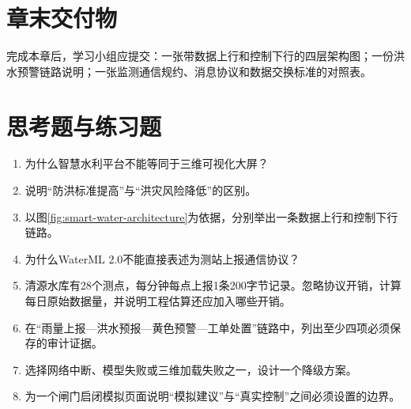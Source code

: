 \section*{章末交付物}

完成本章后，学习小组应提交：一张带数据上行和控制下行的四层架构图；一份洪水预警链路说明；一张监测通信规约、消息协议和数据交换标准的对照表。

\section*{思考题与练习题}

\begin{enumerate}
\item 为什么智慧水利平台不能等同于三维可视化大屏？
\item 说明“防洪标准提高”与“洪灾风险降低”的区别。
\item 以图\ref{fig:smart-water-architecture}为依据，分别举出一条数据上行和控制下行链路。
\item 为什么WaterML 2.0不能直接表述为测站上报通信协议？
\item 清源水库有28个测点，每分钟每点上报1条200字节记录。忽略协议开销，计算每日原始数据量，并说明工程估算还应加入哪些开销。
\item 在“雨量上报—洪水预报—黄色预警—工单处置”链路中，列出至少四项必须保存的审计证据。
\item 选择网络中断、模型失败或三维加载失败之一，设计一个降级方案。
\item 为一个闸门启闭模拟页面说明“模拟建议”与“真实控制”之间必须设置的边界。
\end{enumerate}

